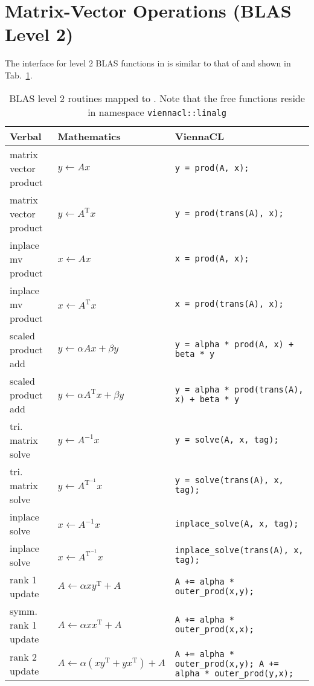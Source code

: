 \section{Matrix-Vector Operations (BLAS Level 2)}
The interface for level 2 BLAS functions in {\ViennaCL} is similar to that of
{\ublas} and shown in Tab.~\ref{tab:blas-level-2}.




\begin{table}[tb]
\begin{center}
\renewcommand{\arraystretch}{1.2}
\begin{tabular}{p{4cm}|l|p{7cm}}
Verbal & Mathematics & ViennaCL\\
\hline
matrix vector product & $y \leftarrow A x$ & \texttt{y = prod(A, x);} \\
matrix vector product & $y \leftarrow A^\mathrm{T} x$ & \texttt{y = prod(trans(A), x);} \\
inplace mv product & $x \leftarrow A x$ & \texttt{x = prod(A, x);} \\
inplace mv product & $x \leftarrow A^\mathrm{T} x$ & \texttt{x = prod(trans(A), x);} \\
\hline
scaled product add & $y \leftarrow \alpha A x + \beta y$ & \texttt{y = alpha * prod(A, x) + beta * y} \\
scaled product add & $y \leftarrow \alpha A^{\mathrm T} x + \beta y$ & \texttt{y = alpha * prod(trans(A), x) + beta * y} \\
\hline
tri. matrix solve & $y \leftarrow A^{-1} x$ & \texttt{y = solve(A, x, tag);} \\
tri. matrix solve & $y \leftarrow A^\mathrm{T^{-1}} x$ & \texttt{y = solve(trans(A), x, tag);} \\
inplace solve & $x \leftarrow A^{-1} x$ & \texttt{inplace\_solve(A, x, tag);} \\
inplace solve & $x \leftarrow A^\mathrm{T^{-1}} x$ & \texttt{inplace\_solve(trans(A), x, tag);} \\
\hline
rank 1 update & $A \leftarrow \alpha x y^{\mathrm T} + A$ & \texttt{A += alpha * outer\_prod(x,y);} \\
symm. rank 1 update & $A \leftarrow \alpha x x^{\mathrm T} + A$ & \texttt{A += alpha * outer\_prod(x,x);} \\
rank 2 update & $A \leftarrow \alpha (x y^{\mathrm T} + y x^{\mathrm T}) + A$ & \texttt{A += alpha * outer\_prod(x,y); A += alpha * outer\_prod(y,x);} \\
\end{tabular}
\caption{BLAS level 2 routines mapped to \ViennaCL. Note that the free functions reside in namespace \texttt{viennacl::linalg}}
\label{tab:blas-level-2}
\end{center}
\end{table}

